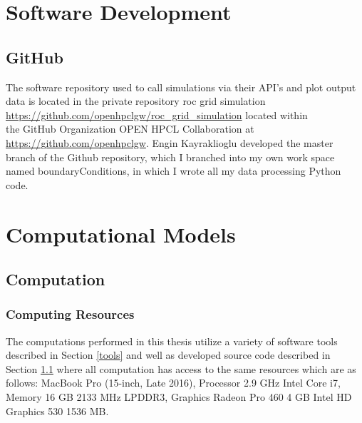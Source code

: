 \begin{appendices}



\chapter{Software Development}

\section{GitHub}\label{sourceCode}
The software repository used to call simulations via their API's and plot output data is located in the private repository roc grid simulation \\ \url{https://github.com/openhpclgw/roc_grid_simulation} located within \\ the GitHub Organization OPEN HPCL Collaboration at \\ \url{https://github.com/openhpclgw}. Engin Kayraklioglu developed the master \\ branch of the Github repository, which I branched into my own work space named boundaryConditions, in which I wrote all my data processing Python code.

\chapter{Computational Models}

\section{Computation}

\subsection{Computing Resources}\label{resources}

\par The computations performed in this thesis utilize a variety of software tools described in Section \ref{tools} and well as developed source code described in Section \ref{sourceCode} where all computation has access to the same resources which are as follows: MacBook Pro (15-inch, Late 2016), Processor 2.9 GHz Intel Core i7, Memory 16 GB 2133 MHz LPDDR3, Graphics Radeon Pro 460 4 GB Intel HD Graphics 530 1536 MB.



\end{appendices}
